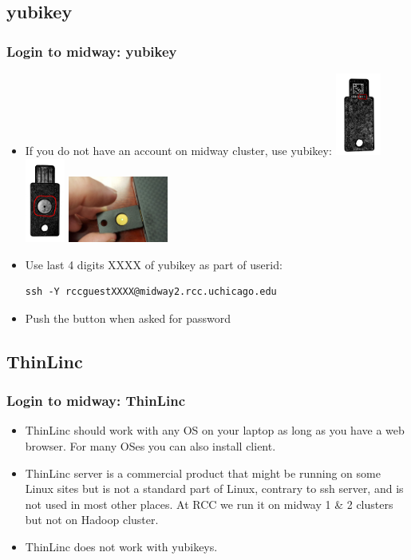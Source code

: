 \subsection{yubikey}
\begin{frame}[fragile]
  \frametitle{Login to midway: yubikey}
  \begin{itemize}
  \item {\color{mycolordef}If you do not have an account on midway cluster}, use {\color{mycolordef}yubikey}:
    \includegraphics[width=1.5cm]{icons/yubikey1a.jpg}
    \includegraphics[width=1.3cm]{icons/yubikey2a.jpg}
    \includegraphics[width=3.3cm]{icons/yubikey3a.jpg}
  \item Use last 4 digits XXXX of yubikey as part of userid:
    {\color{mycolorcli}
\begin{verbatim}
ssh -Y rccguestXXXX@midway2.rcc.uchicago.edu
\end{verbatim}
    }
  \item Push the button when asked for password
  \end{itemize}
\end{frame}

\subsection{ThinLinc}
\begin{frame}[fragile]
  \frametitle{Login to midway: ThinLinc}
  \begin{itemize}
  \item ThinLinc should work with any OS on your laptop as long as you have a web browser. For many OSes you can also install client.
  \item ThinLinc server is a commercial product that might be running on some Linux sites but is not a standard part of Linux, contrary to ssh server, 
    and is not used in most other places. At RCC we run it on midway 1 \& 2 clusters but not on Hadoop cluster.
  \item {\color{mycolordef}ThinLinc does not work with yubikeys}.
  \end{itemize}
\end{frame}

